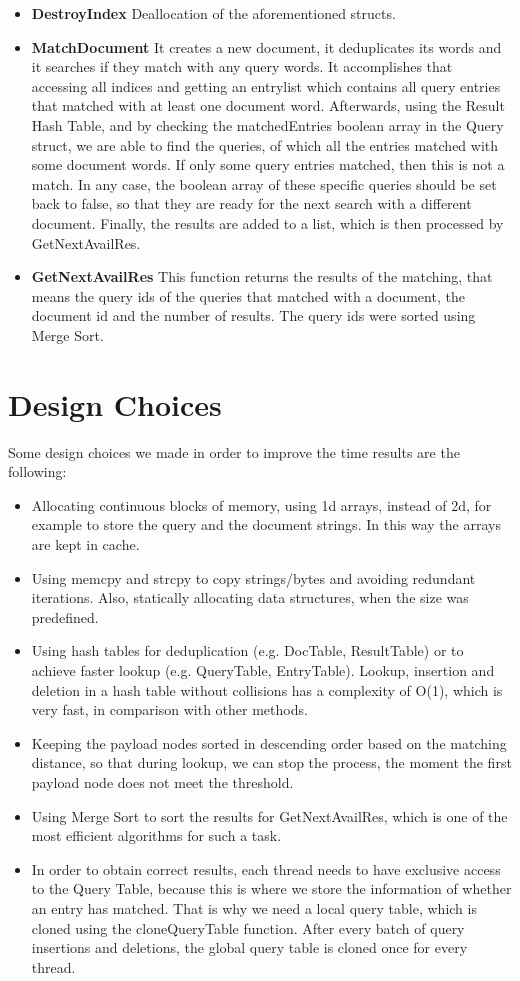 \documentclass{article}
\begin{document}
\begin{itemize}
\begin{itemize}
  \item \textbf{DestroyIndex}
  Deallocation of the aforementioned structs.
  \item \textbf{MatchDocument}
  It creates a new document, it deduplicates its words and it searches if they match with any query words. It accomplishes that accessing all indices and getting an entrylist which contains all query entries that matched with at least one document word. Afterwards, using the Result Hash Table, and by checking the matchedEntries boolean array in the Query struct, we are able to find the queries, of which all the entries matched with some document words. If only some query entries matched, then this is not a match. In any case, the boolean array of these specific queries should be set back to false, so that they are ready for the next search with a different document. Finally, the results are added to a list, which is then processed by GetNextAvailRes.
  \item \textbf{GetNextAvailRes}
  This function returns the results of the matching, that means the query ids of the queries that matched with a document, the document id and the number of results. The query ids were sorted using Merge Sort.
  \end{itemize}
\end{itemize}
\section{Design Choices}
Some design choices we made in order to improve the time results are the following:
\begin{itemize}
    \item Allocating continuous blocks of memory, using 1d arrays, instead of 2d, for example to store the query and the document strings. In this way the arrays are kept in cache.
    \item Using memcpy and strcpy to copy strings/bytes and avoiding redundant iterations. Also, statically allocating data structures, when the size was predefined.
    \item Using hash tables for deduplication (e.g. DocTable, ResultTable) or to achieve faster lookup (e.g. QueryTable, EntryTable). Lookup, insertion and deletion in a hash table without collisions has a complexity of O(1), which is very fast, in comparison with other methods.
    \item Keeping the payload nodes sorted in descending order based on the matching distance, so that during lookup, we can stop the process, the moment the first payload node does not meet the threshold.
    \item Using Merge Sort to  sort the results for GetNextAvailRes, which is one of the most efficient algorithms for such a task.
    \item In order to obtain correct results, each thread needs to have exclusive access to the Query Table, because this is where we store the information of whether an entry has matched. That is why we need a local query table, which is cloned using the cloneQueryTable function. After every batch of query insertions and deletions, the global query table is cloned once for every thread.
\end{itemize}
\end{document}
